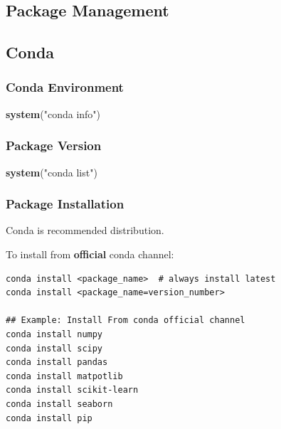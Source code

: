 \documentclass[
]{book}
\newenvironment{Shaded}{\begin{snugshade}}{\end{snugshade}}
\newcommand{\KeywordTok}[1]{\textcolor[rgb]{0.27,0.27,0.27}{\textbf{#1}}}
\newcommand{\NormalTok}[1]{#1}
\newcommand{\StringTok}[1]{\textcolor[rgb]{0.5,0.5,0.5}{#1}}
\begin{document}
\hypertarget{package-management}{%
\subsection{Package Management}\label{package-management}}

\hypertarget{conda}{%
\subsection{Conda}\label{conda}}

\hypertarget{conda-environment}{%
\subsubsection{Conda Environment}\label{conda-environment}}

\begin{Shaded}
\begin{Highlighting}[]
\KeywordTok{system}\NormalTok{(}\StringTok{"conda info"}\NormalTok{)}
\end{Highlighting}
\end{Shaded}

\hypertarget{package-version}{%
\subsubsection{Package Version}\label{package-version}}

\begin{Shaded}
\begin{Highlighting}[]
\KeywordTok{system}\NormalTok{(}\StringTok{"conda list"}\NormalTok{) }
\end{Highlighting}
\end{Shaded}

\hypertarget{package-installation}{%
\subsubsection{Package Installation}\label{package-installation}}

Conda is recommended distribution.

To install from \textbf{official} conda channel:

\begin{verbatim}
conda install <package_name>  # always install latest
conda install <package_name=version_number>

## Example: Install From conda official channel
conda install numpy
conda install scipy
conda install pandas
conda install matpotlib
conda install scikit-learn
conda install seaborn
conda install pip
\end{verbatim}
\end{document}
